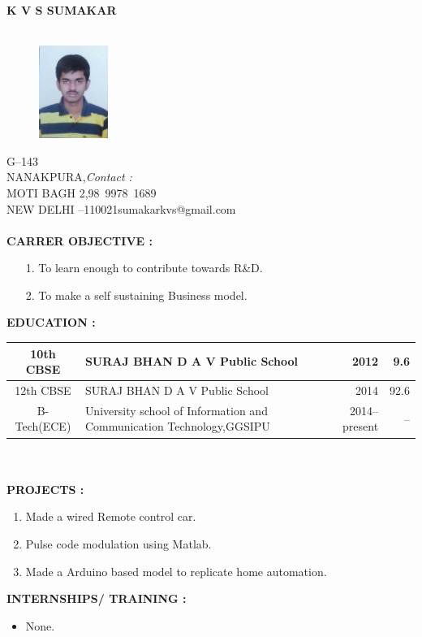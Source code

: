 \documentclass{article}
\begin{document}
	\begin{center}
		\textbf{K V S SUMAKAR}\\
		\hrulefill\\
		
	\end{center}
	\begin{figure}[h]
		\centering
	\includegraphics[width=0.2\textwidth]{IMG-20160524-WA0002}
	
	\end{figure}
	G--143\\ 
	NANAKPURA,\hfill \textsl{Contact :}\\
	MOTI BAGH 2,\hfill \mbox{98 9978 1689}\\
	NEW DELHI --\mbox{110021}\hfill \mbox{sumakarkvs@gmail.com}\\
	\\
	
	\textbf{CARRER OBJECTIVE :}
	\begin{itemize}
\item[1.] 	To learn enough to contribute towards R\&D.
\item[2.]	To make a self sustaining Business model.\\
	\end{itemize}
	

	\textbf{EDUCATION :\\}

	\begin{tabular}{|c|p{60 mm}|r|r|}
 \hline
		 10th CBSE  &                    SURAJ BHAN D A V Public School                    &            2012 &             9.6 \\ \hline
		 12th CBSE  &                    SURAJ BHAN D A V Public School                    &            2014 &            92.6 \\ \hline
		B-Tech(ECE) & University school of Information and Communication Technology,GGSIPU &   2014--present &              -- \\ \hline
	\end{tabular}
	\\
	\\

	\textbf{PROJECTS :}
	\begin{enumerate}
		\item Made a wired Remote control car.
		\item Pulse code modulation using Matlab.
		\item Made a Arduino based model to replicate home automation.
	\end{enumerate}

	\textbf{INTERNSHIPS/ TRAINING :}
	\begin{itemize}
		\item None.
	\end{itemize}
	
\end{document}
